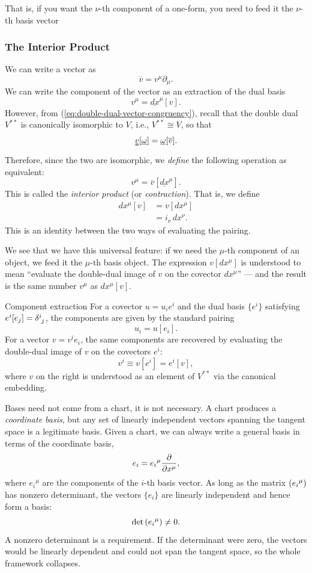 		That is, if you want the $\nu$-th component of a one-form, you need to 
		feed it the $\nu$-th basis vector

	\subsubsection{The Interior Product}
		We can write a vector as
		\[
			\overline v = v^\mu \partial_\mu.
		\]
		We can write the component of the vector as an extraction of the dual basis
		\[
			v^\mu = \underline{dx}^\mu[v].
		\]
		However, from (\ref{eq:double-dual-vector-congruency}), recall that the double dual $V^{**}$ is canonically isomorphic to
		$V$, i.e., $V^{**}\cong V$, so that
		\[
			\uuline{v}[\underline{\omega}] = \underline{\omega}[\overline{v}].
		\]
		Therefore, since the two are isomorphic, we \emph{define} the following
		operation as equivalent:
		\[
			v^\mu = \overline{v}[\underline{dx}^\mu].
		\]
		This is called the \textit{interior product} (or \emph{contraction}).
		That is, we define
		\begin{align*}
			dx^\mu[v] &= v[dx^\mu] \\
					  &= i_\nu\, dx^\nu.
		\end{align*}
		This is an identity between the two ways of evaluating the pairing.

		We see that we have this universal feature: if we need the $\mu$-th
		component of an object, we feed it the $\mu$-th basis object. The
		expression $v[dx^\mu]$ is understood to mean ``evaluate the
		double-dual image of $v$ on the covector $dx^\mu$'' — and the result
		is the same number $v^\mu$ as $dx^\mu[v]$.

		\begin{theorem}{Component extraction}
			For a covector $u = u_i e^i$ and the dual basis $\{e^i\}$
			satisfying $e^i[e_j] = \tensor{\delta}{^i_j}$, the components are given
			by the standard pairing
			\[
				u_i = u[e_i].
			\]
			For a vector $v = v^i e_i$, the same components are recovered
			by evaluating the double-dual image of $v$ on the covectors
			$e^i$:
			\[
				v^i \equiv v[e^i] = e^i[v],
			\]
			where $v$ on the right is understood as an element of $V^{**}$
			via the canonical embedding.
		\end{theorem}

		Bases need not come from a chart, it is not necessary. A chart produces a
		\emph{coordinate basis}, but any set of linearly independent vectors
		spanning the tangent space is a legitimate basis. Given a chart, we
		can always write a general basis in terms of the coordinate basis,
		\[
			e_i = e_i{}^\mu \pdv{}{x^\mu},
		\]
		where $e_i{}^\mu$ are the components of the $i$-th basis vector.
		As long as the matrix $\pqty{e_i{}^\mu}$ has nonzero determinant,
		the vectors $\{e_i\}$ are linearly independent and hence form a basis:
		\[
			\det\pqty{e_i{}^\mu} \neq 0.
		\]
		A nonzero determinant is a requirement. 
		If the determinant were zero, the vectors would be
		linearly dependent and could not span the tangent space, so the whole framework
		collapses.

